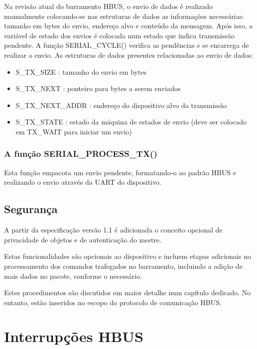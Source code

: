 \documentclass[11pt]{report}
\begin{document}
Na revisão atual do barramento HBUS, o envio de dados é realizado manualmente colocando-se nas estruturas de dados as informações necessárias: tamanho em bytes do envio, endereço alvo e conteúdo da mensagem. Após isso, a variável de estado dos envios é colocada num estado que indica transmissão pendente. A função SERIAL\_CYCLE() verifica as pendências e se encarrega de realizar o envio. As estruturas de dados presentes relacionadas ao envio de dados:

\begin{itemize}

\item S\_TX\_SIZE : tamanho do envio em bytes
\item S\_TX\_NEXT : ponteiro para bytes a serem enviados
\item S\_TX\_NEXT\_ADDR : endereço do dispositivo alvo da transmissão
\item S\_TX\_STATE : estado da máquina de estados de envio (deve ser colocado em TX\_WAIT para iniciar um envio)

\end{itemize}

\subsection{A função SERIAL\_PROCESS\_TX()}

Esta função empacota um envio pendente, formatando-o ao padrão HBUS e realizando o envio através da UART do dispositivo.

\section{Segurança}

A partir da especificação versão 1.1 é adicionada o conceito opcional de privacidade de objetos e de autenticação do mestre.

Estas funcionalidades são opcionais ao dispositivo e incluem etapas adicionais no processamento dos comandos trafegados no barramento, incluindo a adição de mais dados no pacote, conforme o necessário.

Estes procedimentos são discutidos em maior detalhe num capítulo dedicado. No entanto, estão inseridos no escopo do protocolo de comunicação HBUS.

\chapter{Interrupções HBUS}
\end{document}
